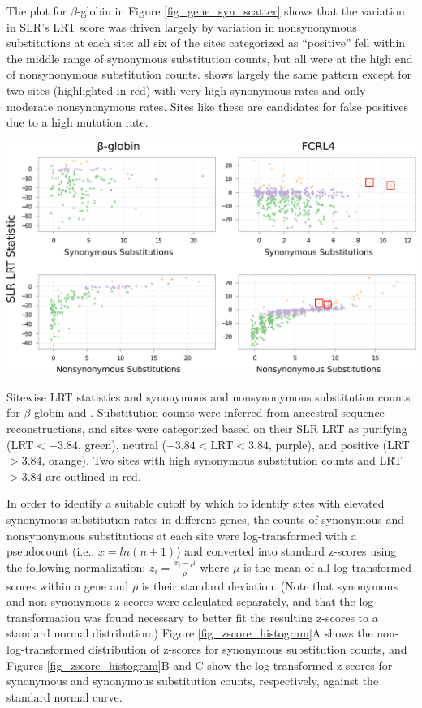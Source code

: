 The plot for $\beta$-globin in Figure \ref{fig_gene_syn_scatter} shows
that the variation in SLR's LRT score was driven largely by variation
in nonsynonymous substitutions at each site: all six of the sites
categorized as ``positive'' fell within the middle range of synonymous
substitution counts, but all were at the high end of nonsynonymous
substitution counts.  shows largely the same pattern
except for two sites (highlighted in red) with very high synonymous
rates and only moderate nonsynonymous rates. Sites like these are
candidates for false positives due to a high mutation rate.

\bbfig
\centering
\includegraphics[scale=0.6]{Figs/gene_syn_scatter.pdf}
\caption{Sitewise LRT statistics and synonymous and nonsynonymous
  substitution counts for $\beta$-globin and
  . Substitution counts were inferred from ancestral
  sequence reconstructions, and sites were categorized based on their
  SLR LRT as purifying (LRT$<-3.84$, green), neutral
  ($-3.84<$LRT$<3.84$, purple), and positive (LRT$>3.84$, orange). Two
  sites with high synonymous substitution counts and LRT$>3.84$ are
  outlined in red. }
\label{fig_gene_syn_scatter}
\eefig

In order to identify a suitable cutoff by which to identify sites with
elevated synonymous substitution rates in different genes, the counts
of synonymous and nonsynonymous substitutions at each site were
log-transformed with a pseudocount (i.e., $x = ln(n + 1)$) and
converted into standard z-scores using the following normalization:
$z_{i} = \frac{x_{i} - \mu}{\rho}$ where $\mu$ is the mean of all
log-transformed scores within a gene and $\rho$ is their standard
deviation. (Note that synonymous and non-synonymous z-scores were
calculated separately, and that the log-transformation was found
necessary to better fit the resulting z-scores to a standard normal
distribution.) Figure \ref{fig_zscore_histogram}A shows the
non-log-transformed distribution of z-scores for synonymous
substitution counts, and Figures \ref{fig_zscore_histogram}B and C
show the log-transformed z-scores for synonymous and synonymous
substitution counts, respectively, against the standard normal curve.

